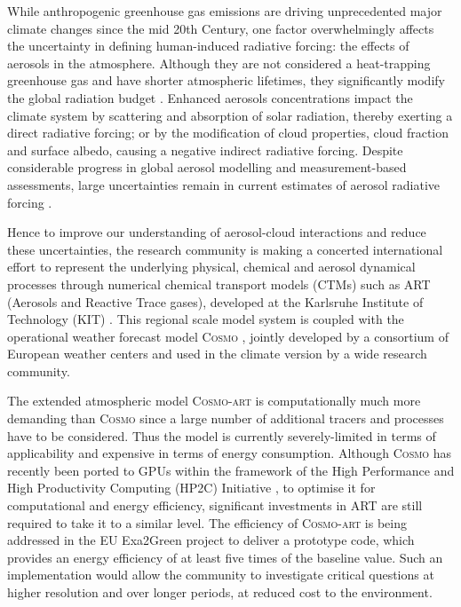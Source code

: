 While anthropogenic greenhouse gas emissions are driving unprecedented
major  climate  changes  since   the  mid  20th  Century,  one  factor
overwhelmingly  affects  the  uncertainty  in  defining  human-induced
radiative  forcing:  the  effects   of  aerosols  in  the  atmosphere.
Although they  are not considered  a heat-trapping greenhouse  gas and
have  shorter  atmospheric lifetimes,  they  significantly modify  the
global   radiation   budget   \citep{IPCC-2013}.   Enhanced   aerosols
concentrations impact the climate  system by scattering and absorption
of solar radiation, thereby exerting a direct radiative forcing; or by
the  modification  of cloud  properties,  cloud  fraction and  surface
albedo,  causing  a  negative  indirect  radiative  forcing.   Despite
considerable  progress in  global aerosol  modelling \citep{Mann-2013}
and  measurement-based  assessments,  large  uncertainties  remain  in
current  estimates  of  aerosol radiative  forcing  \citep{Myhre-2013,
IPCC-2013,  Lee-2013,   Randles-2013,  Rosenfeld-2013,  Sherwood-2013,
Stier-2013}.

Hence to  improve our understanding of  aerosol-cloud interactions and
reduce  these  uncertainties,  the  research  community  is  making  a
concerted international  effort to represent  the underlying physical,
chemical  and aerosol dynamical  processes through  numerical chemical
transport  models (CTMs)  such  as ART  (Aerosols  and Reactive  Trace
gases),   developed   at  the   Karlsruhe   Institute  of   Technology
(KIT)  \citep{Vogel-2009,  Bangert-2011,  Knote-2013}.  This  regional
scale model  system is coupled  with the operational  weather forecast
model  \textsc{Cosmo}  \citep{Baldauf-2011},  jointly developed  by  a
consortium of European weather centers and used in the climate version
by a wide research community.

The extended  atmospheric model \textsc{Cosmo-art}  is computationally
much  more  demanding than  \textsc{Cosmo}  since  a  large number  of
additional  tracers and  processes have  to be  considered.   Thus the
model  is currently  severely-limited  in terms  of applicability  and
expensive in terms of energy consumption.  Although \textsc{Cosmo} has
recently been ported to GPUs \citep{Gysi-2014, Lapillonne-2014} within
the framework of the  High Performance and High Productivity Computing
(HP2C) Initiative  \citep{HP2C}, to optimise it  for computational and
energy efficiency,  significant investments in ART  are still required
to take it  to a similar level.  The  efficiency of \textsc{Cosmo-art}
is being  addressed in the  EU Exa2Green project  \citep{EXA2GREEN} to
deliver a  prototype code, which  provides an energy efficiency  of at
least five times of the  baseline value.  Such an implementation would
allow  the  community  to  investigate critical  questions  at  higher
resolution  and   over  longer  periods,   at  reduced  cost   to  the
environment.

